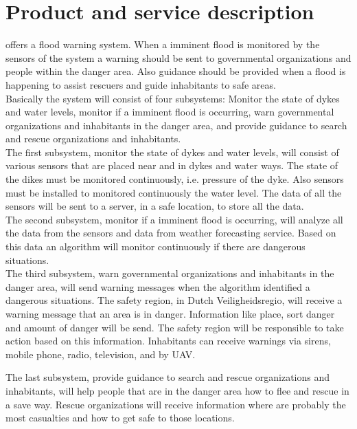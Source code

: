 \section{Product and service description}
\CompanyName offers a flood warning system. When a imminent flood is monitored by the sensors of the system a warning should be sent to governmental organizations and people within the danger area. Also guidance should be provided when a flood is happening to assist rescuers and guide inhabitants to safe areas.\\

Basically the system will consist of four subsystems: Monitor the state of dykes and water levels, monitor if a imminent flood is occurring, warn governmental organizations and inhabitants in the danger area, and provide guidance to search and rescue organizations and inhabitants.\\

The first subsystem, monitor the state of dykes and water levels, will consist of various sensors that are placed near and in dykes and water ways. The state of the dikes must be monitored continuously, i.e. pressure of the dyke. Also sensors must be installed to monitored continuously the water level. The data of all the sensors will be sent to a server, in a safe location, to store all the data.\\

The second subsystem, monitor if a imminent flood is occurring, will analyze all the data from the sensors and data from weather forecasting service. Based on this data an algorithm will monitor continuously if there are dangerous situations.\\

The third subsystem, warn governmental organizations and inhabitants in the danger area, will send warning messages when the algorithm identified a dangerous situations. The safety region, in Dutch Veiligheidsregio, will receive a warning message that an area is in danger. Information like place, sort danger and amount of danger will be send. The safety region will be responsible to take action based on this information. Inhabitants can receive warnings via sirens, mobile phone, radio, television, and by UAV.

The last subsystem, provide guidance to search and rescue organizations and inhabitants, will help people that are in the danger area how to flee and rescue in a save way. Rescue organizations will receive information where are probably the most casualties and how to get safe to those locations.\\


